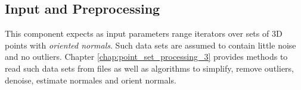 \subsection{Input and Preprocessing}

This component expects as input parameters range iterators over sets of 3D points with \emph{oriented normals}. Such data sets are assumed to contain little noise and no outliers. Chapter  \ref{chap:point_set_processing_3} provides methods to read such data sets from files as well as algorithms to simplify, remove outliers, denoise, estimate normales and orient normals.
